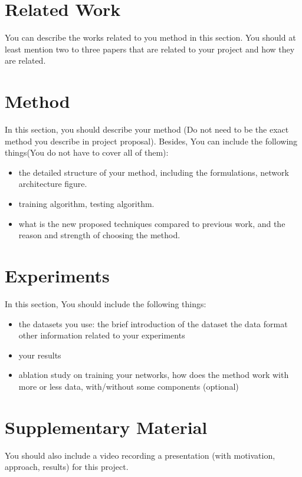 \documentclass{article}
\begin{document}
\section{Related Work}

You can describe the works related to you method in this section. You should at least mention two to three papers that are related to your project and how they are related.

\section{Method}

In this section, you should describe your method (Do not need to be the exact method you describe in project proposal). Besides, You can include the following things(You do not have to cover all of them): 

\begin{itemize}
    \item the detailed structure of your method, including the formulations, network architecture figure.
    \item training algorithm, testing algorithm.
    \item what is the new proposed techniques compared to previous work, and the reason and strength of choosing the method.
\end{itemize}

\section{Experiments}

In this section, You should include the following things:

\begin{itemize}
    \item the datasets you use:
        \subitem the brief introduction of the dataset
        \subitem the data format
        \subitem other information related to your experiments
    \item your results
    \item ablation study on training your networks, how does the method work with more or less data, with/without some components (optional)
\end{itemize}


\section{Supplementary Material}

You should also include a video recording a presentation (with motivation, approach, results) for this project.



\end{document}

